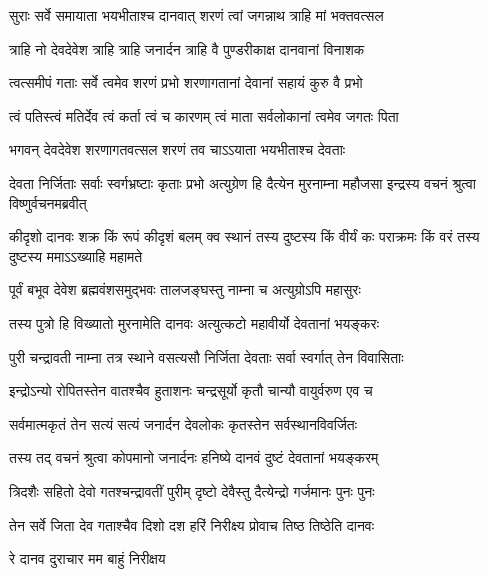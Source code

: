 \twolineshloka
{सुराः सर्वे समायाता भयभीताश्च दानवात्}
{शरणं त्वां जगन्नाथ त्राहि मां भक्तवत्सल}%

\twolineshloka
{त्राहि नो देवदेवेश त्राहि त्राहि जनार्दन}
{त्राहि वै पुण्डरीकाक्ष दानवानां विनाशक}%

\twolineshloka
{त्वत्समीपं गताः सर्वे त्वमेव शरणं प्रभो}
{शरणागतानां देवानां सहायं कुरु वै प्रभो}%

\twolineshloka
{त्वं पतिस्त्वं मतिर्देव त्वं कर्ता त्वं च कारणम्}
{त्वं माता सर्वलोकानां त्वमेव जगतः पिता}%

\twolineshloka
{भगवन् देवदेवेश शरणागतवत्सल}
{शरणं तव चाऽऽयाता भयभीताश्च देवताः}%


\threelineshloka
{देवता निर्जिताः सर्वाः स्वर्गभ्रष्टाः कृताः प्रभो}
{अत्युग्रेण हि दैत्येन मुरनाम्ना महौजसा}
{इन्द्रस्य वचनं श्रुत्वा विष्णुर्वचनमब्रवीत्}%


\threelineshloka
{कीदृशो दानवः शक्र किं रूपं कीदृशं बलम्}
{क्व स्थानं तस्य दुष्टस्य किं वीर्यं कः पराक्रमः}
{किं वरं तस्य दुष्टस्य ममाऽऽख्याहि महामते}%


\twolineshloka
{पूर्वं बभूव देवेश ब्रह्मवंशसमुद्भवः}
{तालजङ्घस्तु नाम्ना च अत्युग्रोऽपि महासुरः}%

\twolineshloka
{तस्य पुत्रो हि विख्यातो मुरनामेति दानवः}
{अत्युत्कटो महावीर्यो देवतानां भयङ्करः}%

\twolineshloka
{पुरी चन्द्रावती नाम्ना तत्र स्थाने वसत्यसौ}
{निर्जिता देवताः सर्वा स्वर्गात् तेन विवासिताः}%

\twolineshloka
{इन्द्रोऽन्यो रोपितस्तेन वातश्चैव हुताशनः}
{चन्द्रसूर्यो कृतौ चान्यौ वायुर्वरुण एव च}%

\twolineshloka
{सर्वमात्मकृतं तेन सत्यं सत्यं जनार्दन}
{देवलोकः कृतस्तेन सर्वस्थानविवर्जितः}%

\twolineshloka
{तस्य तद् वचनं श्रुत्वा कोपमानो जनार्दनः}
{हनिष्ये दानवं दुष्टं देवतानां भयङ्करम्}%

\twolineshloka
{त्रिदशैः सहितो देवो गतश्चन्द्रावतीं पुरीम्}
{दृष्टो देवैस्तु दैत्येन्द्रो गर्जमानः पुनः पुनः}%

\twolineshloka
{तेन सर्वे जिता देव गताश्चैव दिशो दश}
{हरिं निरीक्ष्य प्रोवाच तिष्ठ तिष्ठेति दानवः}%



\onelineshloka
{रे दानव दुराचार मम बाहुं निरीक्षय}%

